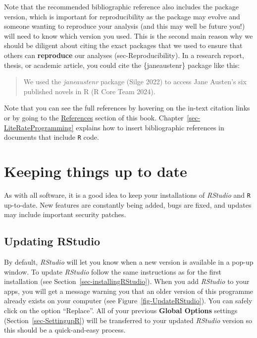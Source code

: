 \documentclass[
  letterpaper,
  DIV=11,
  numbers=noendperiod]{scrreprt}
\begin{document}
Note that the recommended bibliographic reference also includes the
package version, which is important for reproducibility as the package
may evolve and someone wanting to reproduce your analysis (and this may
well be future you!) will need to know which version you used. This is
the second main reason why we should be diligent about citing the exact
packages that we used to ensure that others can \textbf{reproduce} our
analyses (sec-Reproducibility). In a research report, thesis, or
academic article, you could cite the \{janeaustenr\} package like this:

\begin{quote}
We used the \emph{janeaustenr} package (Silge 2022) to access Jane
Austen's six published novels in R (R Core Team 2024).
\end{quote}

Note that you can see the full references by hovering on the in-text
citation links or by going to the
\href{https://elenlefoll.github.io/RstatsTextbook/99_references.html}{References}
section of this book. Chapter~\ref{sec-LiteRateProgramming} explains how
to insert bibliographic references in documents that include \texttt{R}
code.

\section{Keeping things up to date}\label{sec-Updates}

As with all software, it is a good idea to keep your installations of
\emph{RStudio} and \texttt{R} up-to-date. New features are constantly
being added, bugs are fixed, and updates may include important security
patches.

\subsection{Updating RStudio}\label{updating-rstudio}

By default, \emph{RStudio} will let you know when a new version is
available in a pop-up window. To update \emph{RStudio} follow the same
instructions as for the first installation (see
Section~\ref{sec-installingRStudio}). When you add \emph{RStudio} to
your apps, you will get a message warning you that an older version of
this programme already exists on your computer (see
Figure~\ref{fig-UpdateRStudio}). You can safely click on the option
``Replace''. All of your previous \textbf{Global Options} settings
(Section~\ref{sec-SettingupR}) will be transferred to your updated
\emph{RStudio} version so this should be a quick-and-easy process.
\end{document}
